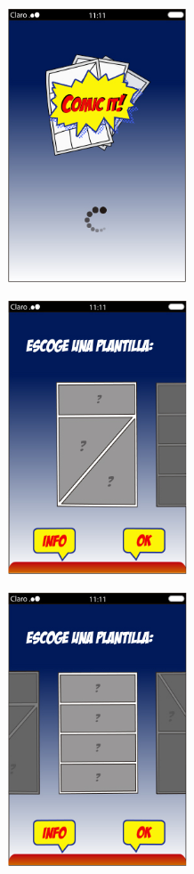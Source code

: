 \documentclass[utf8]{beamer}
\begin{document}
	\begin{frame}
		\begin{center} 
			 \includegraphics[width=0.4\textwidth]{demo7.jpg}
		\end{center}
	\end{frame}
	\begin{frame}
		\begin{center} 
			 \includegraphics[width=0.4\textwidth]{demo8.jpg}
		\end{center}
	\end{frame}
	\begin{frame}
		\begin{center} 
			 \includegraphics[width=0.4\textwidth]{demo9.jpg}
		\end{center}
	\end{frame}
\end{document}
